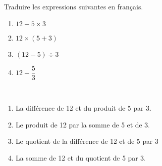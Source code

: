 \begin{exercice}%
    Traduire les expressions suivantes en français.
    \begin{multicols}{2}
      \begin{enumerate}
         \item $12-5\times3$
         \item $12\times(5+3)$
         \item $(12-5)\div3$
         \item $12+\dfrac{5}{3}$
      \end{enumerate}
   \end{multicols}
   \vspace*{-5mm}
 \end{exercice}
 
 \begin{corrige}
    \ \\ [-5mm]
    \begin{enumerate}
       \item \blue La différence de 12 et du produit de 5 par 3.
       \item \blue Le produit de 12 par la somme de 5 et de 3.
       \item \blue Le quotient de la différence de 12 et de 5 par 3
       \item \blue La somme de 12 et du quotient de 5 par 3.
    \end{enumerate}
 \end{corrige}